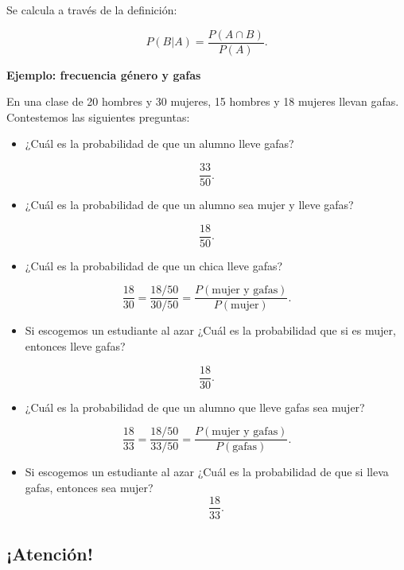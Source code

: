 \documentclass[
  letterpaper,
  DIV=11,
  numbers=noendperiod]{scrreprt}
\providecommand{\tightlist}{%
  \setlength{\itemsep}{0pt}\setlength{\parskip}{0pt}}\usepackage{longtable,booktabs,array}
\begin{document}
Se calcula a través de la definición:

\[
P(B|A)=\frac{P(A\cap B)}{P(A)}.
\]

\textbf{Ejemplo: frecuencia género y gafas}

En una clase de 20 hombres y 30 mujeres, 15 hombres y 18 mujeres llevan
gafas. Contestemos las siguientes preguntas:

\begin{itemize}
\tightlist
\item
  ¿Cuál es la probabilidad de que un alumno lleve gafas?
\end{itemize}

\[
\frac{33}{50}.
\]

\begin{itemize}
\tightlist
\item
  ¿Cuál es la probabilidad de que un alumno sea mujer y lleve gafas?
\end{itemize}

\[
\frac{18}{50}.
\]

\begin{itemize}
\tightlist
\item
  ¿Cuál es la probabilidad de que un chica lleve gafas?
\end{itemize}

\[
\frac{18}{30}=\frac{18/50}{30/50}=\frac{P(\mbox{mujer  y gafas})}{P(\mbox{mujer})}.
\]

\begin{itemize}
\tightlist
\item
  Si escogemos un estudiante al azar ¿Cuál es la probabilidad que si es
  mujer, entonces lleve gafas?
\end{itemize}

\[
\frac{18}{30}.
\]

\begin{itemize}
\tightlist
\item
  ¿Cuál es la probabilidad de que un alumno que lleve gafas sea mujer?
\end{itemize}

\[
\frac{18}{33}=\frac{18/50}{33/50}=\frac{P(\mbox{mujer y gafas})}{P(\mbox{gafas})}.
\]

\begin{itemize}
\tightlist
\item
  Si escogemos un estudiante al azar ¿Cuál es la probabilidad de que si
  lleva gafas, entonces sea mujer? \[
  \frac{18}{33}.
  \]
\end{itemize}

\hypertarget{atenciuxf3n}{%
\subsection{¡Atención!}\label{atenciuxf3n}}
\end{document}
